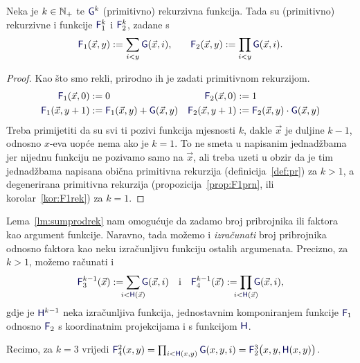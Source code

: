 \begin{lema}[{name=[ograničene sume i produkti čuvaju (primitivnu) rekurzivnost]}]\label{lm:sumprodrek}
    Neka je $k\in{\mathbb N}_+$ te $\f G^k$\! (primitivno) rekurzivna funkcija. Tada su (primitivno) rekurzivne i funkcije $\f F_1^k$ i $\f F_2^k$, zadane s
\begin{equation}
    \f F_1(\vec x,y):=\sum_{i<y}\f G(\vec x,i)\text,\qquad
    \f F_2(\vec x,y):=\prod_{i<y}\f G(\vec x,i)\text.
\end{equation}
\end{lema}
\begin{proof}
    Kao što smo rekli, prirodno ih je zadati primitivnom rekurzijom.
    \begin{align}
        \label{eq:sumG1}\f F_1(\vec x,0)&:=0&\f F_2(\vec x,0)&:=1
        \\
        \label{eq:sumH1}
        \f F_1(\vec x,y+1)&:=\f F_1(\vec x,y)+\f G(\vec x,y)&
        \f F_2(\vec x,y+1)&:=\f F_2(\vec x,y)\cdot\f G(\vec x,y)
    \end{align}
Treba primijetiti da su svi ti pozivi funkcija mjesnosti $k$, dakle $\vec x$ je duljine $k-1$, odnosno $x$-eva uopće nema ako je $k=1$. To ne smeta u napisanim jednadžbama jer nijednu funkciju ne pozivamo samo na $\vec x$, ali treba uzeti u obzir da je tim jednadžbama napisana obična primitivna rekurzija (definicija~\ref{def:pr}) za $k>1$, a degenerirana primitivna rekurzija (propozicija~\ref{prop:F1prn}, ili korolar~\ref{kor:F1rek}) za $k=1$.
\end{proof}

\begin{napomena}[{name=[(primitivno) rekurzivne granice]}]\label{nap:sumprodH}
    Lema~\ref{lm:sumprodrek} nam omogućuje da zadamo broj pribrojnika ili faktora kao argument funkcije. Naravno, tada možemo i \emph{izračunati} broj pribrojnika odnosno faktora kao neku izračunljivu funkciju ostalih argumenata. Precizno, za $k>1$, možemo računati i
\begin{equation}
    \f F_3^{k-1}(\vec x):=\sum_{\mathclap{i<\f H(\vec x)}}\f G(\vec x,i)
    \text{\quad i\quad}\f F_4^{k-1}(\vec x):=\prod_{\mathclap{i<\f H(\vec x)}}\f G(\vec x,i)\text,
\end{equation}
gdje je $\f H^{k-1}$ neka izračunljiva funkcija, jednostavnim komponiranjem funkcije $\f F_1$ odnosno $\f F_2$ s koordinatnim projekcijama i s funkcijom $\f H$.

Recimo, za $k=3$ vrijedi $\f F_4^2(x,y)=\prod_{i<\f H(x,y)}\f G(x,y,i)=\f F_2^3\bigl(x,y,\f H(x,y)\bigr)$.
\end{napomena}

